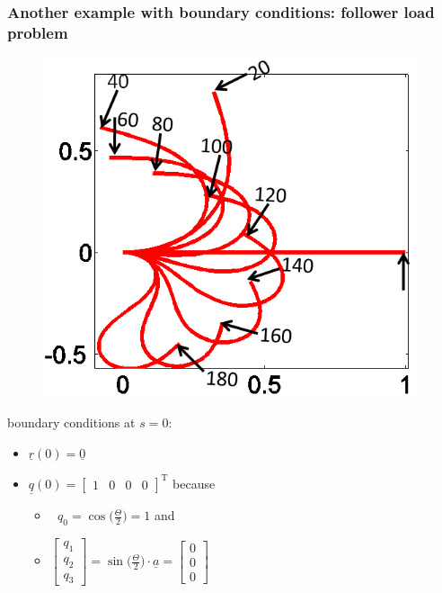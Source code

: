 \begin{frame}
  \frametitle{Another example with boundary conditions: follower load problem}
  \vspace{-1em}
  \begin{multicols}{2}
    \noindent  
    \begin{figure}
      \centering
      \includegraphics[width=11cm, keepaspectratio=true]{sections/cosserat_rods/images/FollowerLoadExample}
    \end{figure}
    
    boundary conditions at $s=0$:
    \begin{itemize}
      \item $\underline{r}(0) = \underline{0}$
      \item $\underline{q}(0) =
        \begin{bmatrix}
          1 & 0 & 0 & 0
        \end{bmatrix}^{\mathrm{T}}$ because
        \begin{itemize}
          \item $\: \: \, q_0 = \cos\bigl( \frac{\Theta}{2} \bigr) = 1$ and
          \item $\begin{bmatrix}
          q_1 \\ q_2 \\ q_3
        \end{bmatrix} = \sin \bigl( \frac{\Theta}{2} \bigr) \cdot \underline{a} =
        \begin{bmatrix}
          0 \\ 0 \\ 0
        \end{bmatrix}$
      \end{itemize}
    \end{itemize}
    

\end{multicols}
\end{frame}
